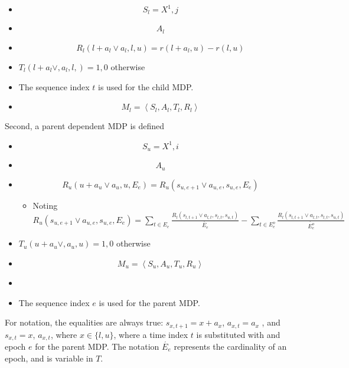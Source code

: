 \documentclass{article}
\begin{document}
\begin{itemize}
\item \begin{equation*}
S_l=X^1,j
\end{equation*}
\item \begin{equation*}
A_l
\end{equation*}
\item \begin{equation*}
R_l\left(l+a_l\vee a_l,l,u\right)=r\left(l+a_l,u\right)-r(l,u)
\end{equation*}
\item  $T_l\left(l+a_l\vee ,a_l,l,\right)=1,0$ otherwise
\item The sequence index  $t$ is used for the child MDP.
\item \begin{equation*}
M_l=\left\langle S_l,A_l,T_l,R_l\right\rangle 
\end{equation*}
\end{itemize}
Second, a parent dependent MDP is defined

\begin{itemize}
\item \begin{equation*}
S_u=X^1,i
\end{equation*}
\item \begin{equation*}
A_u
\end{equation*}
\item \begin{equation*}
R_u\left(u+a_u\vee a_u,u,E_e\right)=R_u\left(s_{u,e+1}\vee a_{u,e},s_{u,e},E_e\right)
\end{equation*}
\begin{itemize}
\item Noting  $R_u\left(s_{u,e+1}\vee a_{u,e},s_{u,e},E_e\right)=\sum _{t{\in}E_e}^{}\frac{R_l\left(s_{l,t+1}\vee a_{l,t},s_{l,t},s_{u,t}\right)}{\acute{E_e}}-\sum _{t{\in}E_e^o}^{}\frac{R_l\left(s_{l,t+1}\vee a_{l,t},s_{l,t},s_{u,t}\right)}{\acute{E_e^o}}$
\end{itemize}
\item  $T_u\left(u+a_u\vee ,a_u,u\right)=1,0$ otherwise
\item \begin{equation*}
M_u=\left\langle S_u,A_u,T_u,R_u\right\rangle 
\end{equation*}
\item 
\bigskip
\item The sequence index  $e$ is used for the parent MDP.
\end{itemize}
For notation, the equalities are always true:  $s_{x,t+1}=x+a_x$,  $a_{x,t}=a_x$ , and $s_{x,t}=x$, $a_{x,t}$, where  $x{\in}\{l,u\}$, where a time index  $t$ is substituted with and epoch  $e$ for the parent MDP. The notation  $\acute{E_e}$ represents the cardinality of an epoch, and is variable in  $T$. 
\end{document}
